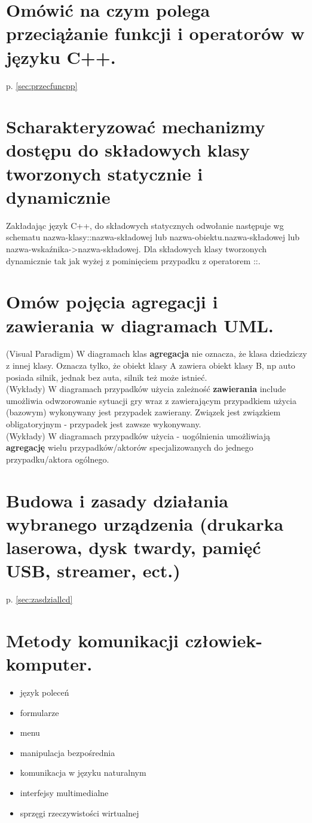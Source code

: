 \documentclass[12pt,a4paper]{article}
\begin{document}
	\section{Omówić na czym polega przeciążanie funkcji i operatorów w języku C++.}
	p. \ref{sec:przecfuncpp}

	\section{Scharakteryzować mechanizmy dostępu do składowych klasy tworzonych statycznie i dynamicznie}
	Zakładając język C++, do składowych statycznych odwołanie następuje wg schematu nazwa-klasy::nazwa-składowej lub nazwa-obiektu.nazwa-składowej lub nazwa-wskaźnika->nazwa-składowej. Dla składowych klasy tworzonych dynamicznie tak jak wyżej z pominięciem przypadku z operatorem ::.

	\section{Omów pojęcia agregacji i zawierania w diagramach UML.}
	(Visual Paradigm) W diagramach klas \textbf{agregacja} nie oznacza, że klasa dziedziczy z innej klasy. Oznacza tylko, że obiekt klasy A zawiera obiekt klasy B, np auto 	posiada silnik, jednak bez auta, silnik też może istnieć.\\
(Wykłady) W diagramach przypadków użycia zależność \textbf{zawierania} include umożliwia odwzorowanie sytuacji gry wraz z zawierającym przypadkiem użycia (bazowym) wykonywany jest przypadek zawierany. Związek jest związkiem obligatoryjnym - przypadek jest zawsze wykonywany.\\
(Wykłady) W diagramach przypadków użycia - uogólnienia umożliwiają \textbf{agregację} wielu przypadków/aktorów specjalizowanych do jednego przypadku/aktora ogólnego.

	\section{Budowa i zasady działania wybranego urządzenia (drukarka laserowa, dysk twardy, pamięć USB, streamer, ect.)}
	p. \ref{sec:zasdziallcd}

	\section{Metody komunikacji człowiek-komputer.}
	\begin{itemize}
		\item język poleceń
		\item formularze
		\item menu
		\item manipulacja bezpośrednia
		\item komunikacja w języku naturalnym
		\item interfejsy multimedialne
		\item sprzęgi rzeczywistości wirtualnej
	\end{itemize}
\end{document}
